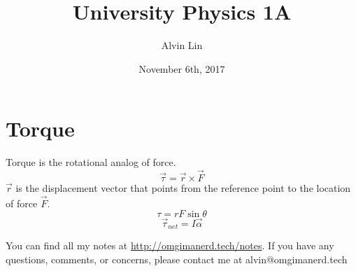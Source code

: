 \documentclass{math}
\title{University Physics 1A}
\author{Alvin Lin}
\date{November 6th, 2017}
\begin{document}
\maketitle

\section*{Torque}
Torque is the rotational analog of force.
\[ \vec{\tau} = \vec{r}\times\vec{F} \]
\( \vec{r} \) is the displacement vector that points from the reference point to
the location of force \( \vec{F} \).
\[ \tau = rF\sin\theta \]
\[ \vec{\tau}_{net} = I\vec{\alpha} \]

\begin{center}
  You can find all my notes at \url{http://omgimanerd.tech/notes}. If you have
  any questions, comments, or concerns, please contact me at
  alvin@omgimanerd.tech
\end{center}
\end{document}
